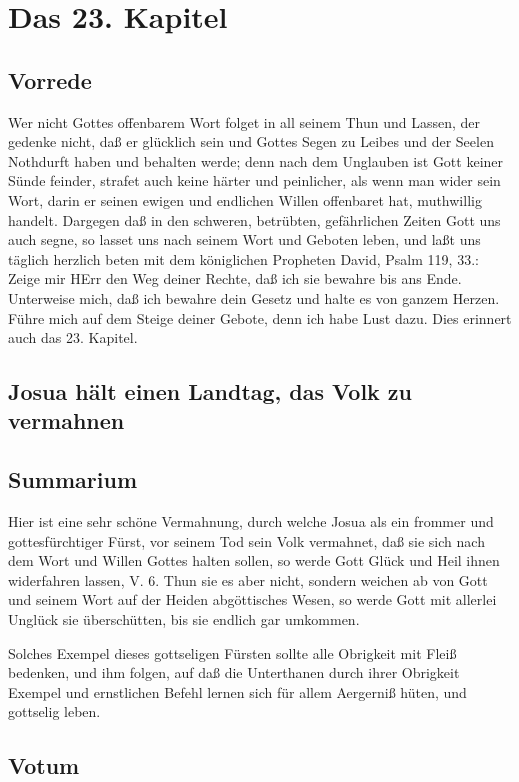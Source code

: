 \chapter{Das 23. Kapitel}

\section{Vorrede}

Wer nicht Gottes offenbarem Wort folget in all seinem Thun und Lassen, der gedenke nicht, daß er glücklich sein und Gottes Segen zu Leibes und der Seelen Nothdurft haben und behalten werde; denn nach dem Unglauben ist Gott keiner Sünde feinder, strafet auch keine härter und peinlicher, als wenn man wider sein Wort, darin er seinen ewigen und endlichen Willen offenbaret hat, muthwillig handelt. Dargegen daß in den schweren, betrübten, gefährlichen Zeiten Gott uns auch segne, so lasset uns nach seinem Wort und Geboten leben, und laßt uns täglich herzlich beten mit dem königlichen Propheten David, Psalm 119, 33.: Zeige mir HErr den Weg deiner Rechte, daß ich sie bewahre bis ans Ende. Unterweise mich, daß ich bewahre dein Gesetz und halte es von ganzem Herzen. Führe mich auf dem Steige deiner Gebote, denn ich habe Lust dazu. Dies erinnert auch das 23. Kapitel.

\section{Josua hält einen Landtag, das Volk zu vermahnen}
\section{Summarium}

Hier ist eine sehr schöne Vermahnung, durch welche Josua als ein frommer und gottesfürchtiger Fürst, vor seinem Tod sein Volk vermahnet, daß sie sich nach dem Wort und Willen Gottes halten sollen, so werde Gott Glück und Heil ihnen widerfahren lassen, V. 6. Thun sie es aber nicht, sondern weichen ab von Gott und seinem Wort auf der Heiden abgöttisches Wesen, so werde Gott mit allerlei Unglück sie überschütten, bis sie endlich gar umkommen.

Solches Exempel dieses gottseligen Fürsten sollte alle Obrigkeit mit Fleiß bedenken, und ihm folgen, auf daß die Unterthanen durch ihrer Obrigkeit Exempel und ernstlichen Befehl lernen sich für allem Aergerniß hüten, und gottselig leben.

\section{Votum}

